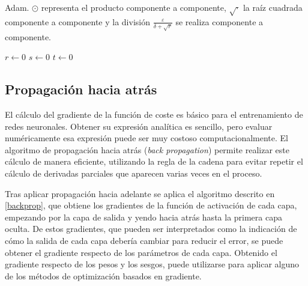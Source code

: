 \begin{algorithm}
\label{adam}
 \caption{Adam. $\odot$ representa el producto componente a componente, $\sqrt{\cdot}$ la raíz cuadrada componente a componente y la división $\frac{\varepsilon}{\delta + \sqrt{r}}$ se realiza componente a componente.}
     \SetAlgoLined
     \KwIn{$\rho_1, \rho_2 \in [0,1)$ ratios de decaimeiento exponencial, sugeridos por defecto $0,9$ y $0,99$}
     $r \leftarrow 0$\;
     $s \leftarrow 0$\;
     $t \leftarrow 0$\;
\end{algorithm}

\subsection{Propagación hacia atrás}\label{back-propagation}

El cálculo del gradiente de la función de coste es básico para el entrenamiento de redes neuronales. Obtener su expresión analítica es sencillo, pero evaluar numéricamente esa expresión puede ser muy costoso computacionalmente. El algoritmo de propagación hacia atrás (\textit{back propagation}) permite realizar este cálculo de manera eficiente, utilizando la regla de la cadena para evitar repetir el cálculo de derivadas parciales que aparecen varias veces en el proceso.

Tras aplicar propagación hacia adelante se aplica el algoritmo descrito en \ref{backprop}, que obtiene los gradientes de la función de activación de cada capa, empezando por la capa de salida y yendo hacia atrás hasta la primera capa oculta. De estos gradientes, que pueden ser interpretados como la indicación de cómo la salida de cada capa debería cambiar para reducir el error, se puede obtener el gradiente respecto de los parámetros de cada capa. Obtenido el gradiente respecto de los pesos y los sesgos, puede utilizarse para aplicar alguno de los métodos de optimización basados en gradiente.

